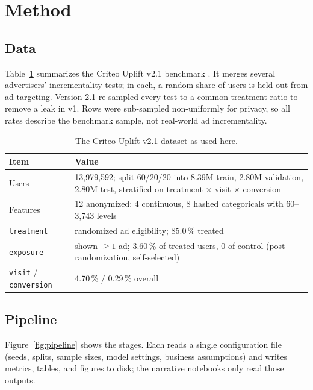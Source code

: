 \section{Method}
\label{sec:method}

\subsection{Data}
\label{sec:data}

Table~\ref{tab:data} summarizes the Criteo Uplift v2.1 benchmark
\cite{diemert2021}. It merges several advertisers' incrementality tests; in
each, a random share of users is held out from ad targeting. Version 2.1
re-sampled every test to a common treatment ratio to remove a leak in v1.
Rows were sub-sampled non-uniformly for privacy, so all rates describe the
benchmark sample, not real-world ad incrementality.

\begin{table}[H]
\centering
\caption{The Criteo Uplift v2.1 dataset as used here.}
\label{tab:data}
\small
\begin{tabular}{l p{9.5cm}}
\toprule
\textbf{Item} & \textbf{Value} \\
\midrule
Users & 13,979,592; split 60/20/20 into 8.39M train, 2.80M validation,
        2.80M test, stratified on treatment $\times$ visit $\times$ conversion \\
Features & 12 anonymized: 4 continuous, 8 hashed categoricals with 60--3,743 levels \\
\texttt{treatment} & randomized ad eligibility; 85.0\,\% treated \\
\texttt{exposure} & shown $\ge 1$ ad; 3.60\,\% of treated users, 0 of control
                    (post-randomization, self-selected) \\
\texttt{visit} / \texttt{conversion} & 4.70\,\% / 0.29\,\% overall \\
\bottomrule
\end{tabular}
\end{table}

\subsection{Pipeline}
\label{sec:pipeline}

Figure~\ref{fig:pipeline} shows the stages. Each reads a single
configuration file (seeds, splits, sample sizes, model settings, business
assumptions) and writes metrics, tables, and figures to disk; the narrative
notebooks only read those outputs.

